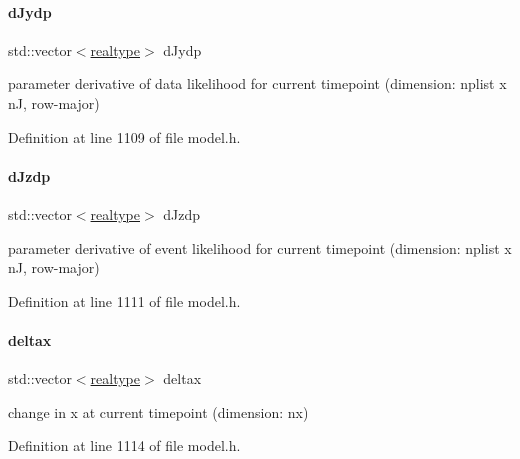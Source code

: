 \mbox{\label{classamici_1_1_model_a6cabcac49200072c8efd301339f5f445}} 
\paragraph{\texorpdfstring{d\+Jydp}{dJydp}}
{\footnotesize\ttfamily std\+::vector$<$\mbox{\hyperlink{namespaceamici_a1bdce28051d6a53868f7ccbf5f2c14a3}{realtype}}$>$ d\+Jydp}

parameter derivative of data likelihood for current timepoint (dimension\+: nplist x nJ, row-\/major) 

Definition at line 1109 of file model.\+h.

\mbox{\label{classamici_1_1_model_a0a3bc96cfcf3d3469d9351f8759191b1}} 
\paragraph{\texorpdfstring{d\+Jzdp}{dJzdp}}
{\footnotesize\ttfamily std\+::vector$<$\mbox{\hyperlink{namespaceamici_a1bdce28051d6a53868f7ccbf5f2c14a3}{realtype}}$>$ d\+Jzdp}

parameter derivative of event likelihood for current timepoint (dimension\+: nplist x nJ, row-\/major) 

Definition at line 1111 of file model.\+h.

\mbox{\label{classamici_1_1_model_ab259d30491631b3ad9fcf84f4f84da75}} 
\paragraph{\texorpdfstring{deltax}{deltax}}
{\footnotesize\ttfamily std\+::vector$<$\mbox{\hyperlink{namespaceamici_a1bdce28051d6a53868f7ccbf5f2c14a3}{realtype}}$>$ deltax}

change in x at current timepoint (dimension\+: nx) 

Definition at line 1114 of file model.\+h.

\mbox{\label{classamici_1_1_model_a3be615f0dfbef0fb7bee840abde04459}} 
